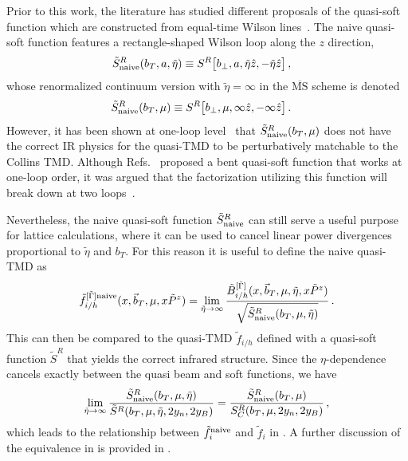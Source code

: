 \documentclass[11pt,a4paper]{article}
\newcommand{\MSbar}{{\overline{\mathrm{MS}}}}
\newcommand{\bt}{\vec b_T}
\begin{document}
Prior to this work, the literature has studied different proposals of the quasi-soft function which are constructed from equal-time Wilson lines~\cite{Ji:2014hxa,Ji:2018hvs,Ebert:2018gzl,Ebert:2019okf,Ji:2019sxk,Ji:2019ewn}. The naive quasi-soft function features a rectangle-shaped Wilson loop along the $z$ direction,
\begin{align}
\tilde S^R_{\rm naive}(b_T, a , \tilde \eta)
 &\equiv S^R\bigl[b_\perp, a, \tilde \eta \hat{z},  -\tilde \eta \hat{z}\bigr]
\,,\end{align}
whose renormalized continuum version with $\tilde\eta =\infty$ in the $\MSbar$ scheme is denoted
\begin{align} \label{eq:nsoft}
\tilde S^R_{\rm naive}(b_T, \mu)
 &\equiv S^R\bigl[b_\perp, \mu, \infty \hat{z}, -\infty \hat{z}\bigr]
\,.\end{align}
However, it has been shown at one-loop level~\cite{Ebert:2019okf} that $\tilde S^R_{\rm naive}(b_T, \mu)$ does not have the correct IR physics for the quasi-TMD to be perturbatively matchable to the Collins TMD. Although Refs.~\cite{Ji:2018hvs,Ebert:2019okf} proposed a bent quasi-soft function that works at one-loop order, it was argued that the factorization utilizing this function will break down at two loops~\cite{Ji:2019sxk}. 

Nevertheless, the naive quasi-soft function $\tilde S^R_{\rm naive}$ can still serve a useful purpose for lattice calculations, where it can be used to cancel linear power divergences proportional to $\tilde \eta$ and $b_T$. For this reason it is useful to define the naive quasi-TMD as
\begin{align}
 \tilde f_{i/h}^{[\tilde \Gamma]\rm naive} (x, \bt, \mu, x\tilde P^z)
 = \lim_{\tilde \eta\to\infty}
   \frac{\tilde B_{i/h}^{[\tilde \Gamma]}(x, \bt, \mu, \tilde\eta, x\tilde P^z)}
    {\sqrt{\tilde S^R_{\rm naive}(b_T, \mu , \tilde \eta)}}
\,.\end{align}
This can then be compared to the quasi-TMD $\tilde f_{i/h}$ defined with a quasi-soft function $\tilde S^R$ that yields the correct infrared structure.
Since the $\eta$-dependence cancels exactly between the quasi beam and soft functions, we have
\begin{align}\label{eq:etalimit}
	\lim_{\tilde\eta\to\infty}\frac{\tilde S^R_{\rm naive}(b_T, \mu , \tilde \eta)}{\tilde S^R(b_T, \mu, \tilde \eta, 2y_n, 2y_B)} = \frac{\tilde S^R_{\text{naive}}(b_T,\mu)}{S_C^R(b_T,\mu, 2y_n, 2y_B)}\,,
\end{align}
which leads to the relationship between $\tilde f^{\rm naive}_i$ and $\tilde f_i$ in . A further discussion of the equivalence in  is provided in .
\end{document}
